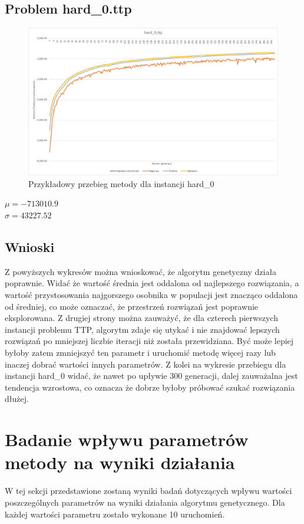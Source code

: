 \documentclass{article}
\begin{document}
	\subsection{Problem hard\_0.ttp}
	\begin{figure}[H]
		\centering
		\includegraphics[width=1\linewidth]{hard0.png}
		\caption{Przykładowy przebieg metody dla instancji hard\_0}
		\label{fig:hard0}
	\end{figure}
	\begin{center}
		$\mu = -713010.9$
		\\$\sigma = 43227.52$
	\end{center}

	\subsection{Wnioski}
	Z powyższych wykresów można wnioskować, że algorytm genetyczny działa poprawnie. Widać że wartość średnia jest oddalona od najlepszego rozwiązania, a wartość przystosowania najgorszego osobnika w populacji jest znacząco oddalona od średniej, co może oznaczać, że przestrzeń rozwiązań jest poprawnie eksplorowana. Z drugiej strony można zauważyć, że dla czterech pierwszych instancji problemu TTP, algorytm zdaje się utykać i nie znajdować lepszych rozwiązań po mniejszej liczbie iteracji niż została przewidziana. Być może lepiej byłoby zatem zmniejszyć ten parametr i uruchomić metodę więcej razy lub inaczej dobrać wartości innych parametrów.
	Z kolei na wykresie przebiegu dla instancji hard\_0 widać, że nawet po upływie 300 generacji, dalej zauważalna jest tendencja wzrostowa, co oznacza że dobrze byłoby próbować szukać rozwiązania dłużej.


	\section{Badanie wpływu parametrów metody na \mbox{wyniki} działania}
	W tej sekcji przedstawione zostaną wyniki badań dotyczących wpływu wartości poszczególnych parametrów na wyniki działania algorytmu genetycznego. Dla każdej wartości parametru zostało wykonane 10 uruchomień.
\end{document}
